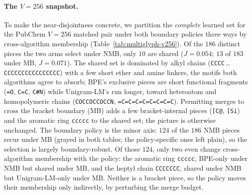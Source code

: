 \documentclass{article}
\begin{document}
\paragraph{The $V{=}256$ snapshot.}

To make the near-disjointness concrete, we
partition the \emph{complete} learned set for the PubChem $V{=}256$ matched pair
under both boundary policies three ways by cross-algorithm membership
(Table~\ref{tab:multiglyph-v256}). Of the $186$ distinct pieces the two arms select
under NMB, only $10$ are shared ($J{=}0.054$; $13$ of $183$ under MB,
$J{=}0.071$). The shared set is dominated by alkyl chains
(\texttt{CCCC}\,\dots\,\texttt{CCCCCCCCCCCCCCCC}) with a few short ether and amine
linkers, the motifs both algorithms agree to absorb; BPE's exclusive pieces are
short functional fragments (\texttt{=O}, \texttt{C=C}, \texttt{C\#N}) while
Unigram-LM's run longer, toward heteroatom and homopolymeric chains
(\texttt{COCCOCCOCCN}, \texttt{=C=C=C=C=C=C=C=C}). Permitting merges to cross the
bracket boundary (MB) adds a few bracket-internal pieces (\texttt{[C@},
\texttt{[Si}) and the aromatic ring \texttt{ccccc} to the shared set; the picture
is otherwise unchanged. The boundary policy is the minor axis: $124$ of
the $186$ NMB pieces recur under MB (grayed in both tables; the policy-specific
ones left plain), so the selection is largely boundary-robust. Of those $124$, only two even change cross-algorithm membership
with the policy: the aromatic ring \texttt{ccccc}, BPE-only
under NMB but shared under MB, and the heptyl chain \texttt{CCCCCCC}, shared under
NMB but Unigram-LM-only under MB. Neither is a bracket piece, so the policy moves
their membership only indirectly, by perturbing the merge budget.
\end{document}
